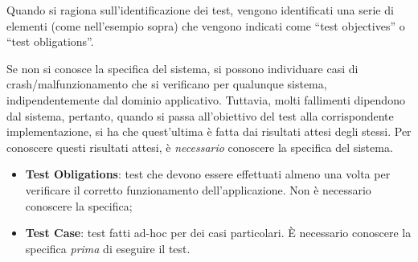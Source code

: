 Quando si ragiona sull'identificazione dei test, vengono identificati una serie di elementi (come nell'esempio sopra) che vengono indicati come ``test objectives'' o ``test obligations''.

Se non si conosce la specifica del sistema, si possono individuare casi di crash/malfunzionamento che si verificano per qualunque sistema, indipendentemente dal dominio applicativo. Tuttavia, molti fallimenti dipendono dal sistema, pertanto, quando si passa all'obiettivo del test alla corrispondente implementazione, si ha che quest'ultima è fatta dai risultati attesi degli stessi. Per conoscere questi risultati attesi, è \textit{necessario} conoscere la specifica del sistema.

\begin{itemize}
    \item \textbf{Test Obligations}: test che devono essere effettuati almeno una volta per verificare il corretto funzionamento dell'applicazione. Non è necessario conoscere la specifica;
    \item \textbf{Test Case}: test fatti ad-hoc per dei casi particolari. È necessario conoscere la specifica \textit{prima} di eseguire il test.
\end{itemize}


